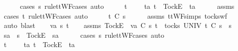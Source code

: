 \begin{isabellebody}
\ \ \ \ \isamarkupfalse%
\ {\isacharparenleft}cases\ s{}{\isacharprime}\ rule{\isacharcolon}ttWF{\isachardot}cases{\isacharcomma}\ auto{\isacharparenright}\isanewline
\ \ \isamarkupfalse%
\ \isamarkupfalse%
\ {\isachardoublequoteopen}t\ {\isacharequal}\ {\isacharbrackleft}{\isacharbrackright}\ {\isasymor}\ {\isacharparenleft}{\isasymexists}\ ta{\isachardot}\ t\ {\isacharequal}\ {\isacharbrackleft}Tock{\isacharbrackright}\isactrlsub E\ {\isacharhash}\ ta{\isacharparenright}{\isachardoublequoteclose}\isanewline
\ \ \ \ \isamarkupfalse%
\ assms{\isacharparenleft}{}{\isacharparenright}\ \isamarkupfalse%
\ {\isacharparenleft}cases\ t\ rule{\isacharcolon}ttWF{\isachardot}cases{\isacharcomma}\ auto{\isacharparenright}\isanewline
\ \ \isamarkupfalse%
\ \isamarkupfalse%
\ {\isachardoublequoteopen}t\ {\isasymle}\isactrlsub C\ s{}{\isacharprime}{\isachardoublequoteclose}\isanewline
\ \ \ \ \isamarkupfalse%
\ assms{\isacharparenleft}{}{\isacharparenright}\ ttWF{\isachardot}simps{\isacharparenleft}{}{\isacharparenright}\ tocks{\isacharunderscore}wf\ \isamarkupfalse%
\ {\isacharparenleft}auto{\isacharcomma}\ blast{\isacharparenright}\isanewline
{}\isamarkupfalse%
\isanewline
\ \ \isamarkupfalse%
\ va\ s{}{\isacharprime}\ t\isanewline
\ \ \isamarkupfalse%
\ assms{\isacharcolon}\ {\isachardoublequoteopen}{\isacharbrackleft}Tock{\isacharbrackright}\isactrlsub E\ {\isacharhash}\ va\ {\isasymsubseteq}\isactrlsub C\ s{}{\isacharprime}{\isachardoublequoteclose}\ {\isachardoublequoteopen}t\ {\isasymin}\ tocks\ UNIV{\isachardoublequoteclose}\ {\isachardoublequoteopen}t\ {\isasymle}\isactrlsub C\ s{}{\isacharprime}\ {\isacharat}\ s{}{\isachardoublequoteclose}\isanewline
\ \ \isamarkupfalse%
\ \isamarkupfalse%
\ s{}{\isacharprime}a\ \ {\isachardoublequoteopen}s{}{\isacharprime}\ {\isacharequal}\ {\isacharbrackleft}Tock{\isacharbrackright}\isactrlsub E\ {\isacharhash}\ s{}{\isacharprime}a{\isachardoublequoteclose}\isanewline
\ \ \ \ \isamarkupfalse%
\ {\isacharparenleft}cases\ s{}{\isacharprime}\ rule{\isacharcolon}ttWF{\isachardot}cases{\isacharcomma}\ auto{\isacharparenright}\isanewline
\ \ \isamarkupfalse%
\ \isamarkupfalse%
\ {\isachardoublequoteopen}t\ {\isacharequal}\ {\isacharbrackleft}{\isacharbrackright}\ {\isasymor}\ {\isacharparenleft}{\isasymexists}\ ta{\isachardot}\ t\ {\isacharequal}\ {\isacharbrackleft}Tock{\isacharbrackright}\isactrlsub E\ {\isacharhash}\ ta{\isacharparenright}{\isachardoublequoteclose}\isanewline

\end{isabellebody}
